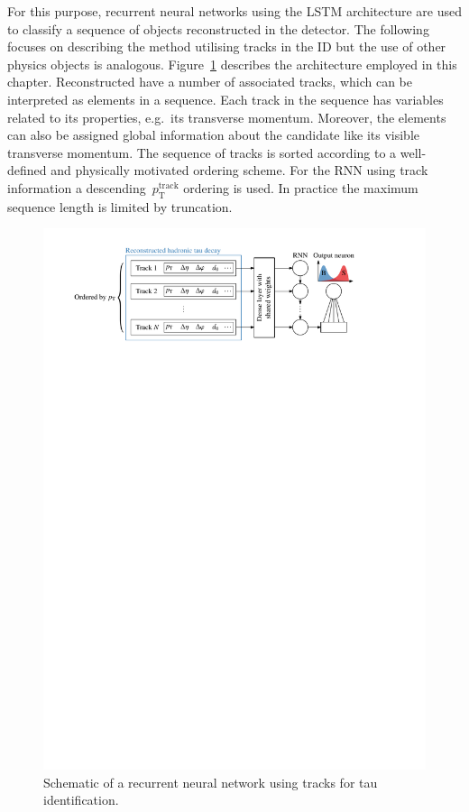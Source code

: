 For this purpose, recurrent neural networks using the LSTM architecture are used
to classify a sequence of objects reconstructed in the detector. The following
focuses on describing the method utilising tracks in the ID but the use of other
physics objects is analogous. Figure~\ref{fig:track_rnn_schematic} describes the
architecture employed in this chapter. Reconstructed \tauhadvis have a number of
associated tracks, which can be interpreted as elements in a sequence. Each
track in the sequence has variables related to its properties, e.g.\ its
transverse momentum. Moreover, the elements can also be assigned global
information about the \tauhadvis candidate like its visible transverse momentum.
The sequence of tracks is sorted according to a well-defined and physically
motivated ordering scheme. For the RNN using track information a
descending~$p_\text{T}^\text{track}$ ordering is used. 
In practice the maximum sequence length is limited by truncation.

\begin{figure}[htb]
  \centering
  \includegraphics[scale=0.9]{./figures/rnn/track_rnn_schematic.pdf}
  \caption[Schematic of a RNN using tracks for tau identification]{Schematic of
    a recurrent neural network using tracks for tau identification.}
  \label{fig:track_rnn_schematic}
\end{figure}

